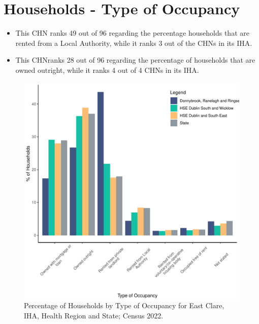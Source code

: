 \documentclass{article}
\begin{document}
\section{Households - Type of Occupancy}\label{sect:Households}
\begin{itemize}
\item This CHN ranks  49 out of 96 regarding the percentage households that are rented from a Local Authority, while it ranks  3 out of the CHNs in its IHA. 
\item This CHNranks  28 out of 96 regarding the percentage of households that are owned outright, while it ranks   4 out of 4 CHNs in its IHA.
\end{itemize}
\begin{figure}[H]
	\centering
	\includegraphics[width = 140mm]{../figures/HouseholdsED.pdf}
	\caption{Percentage of Households by Type of Occupancy for East Clare, IHA, Health Region and State; Census 2022.}
	\label{fig:vbnv}
	\end{figure}
\end{document}
